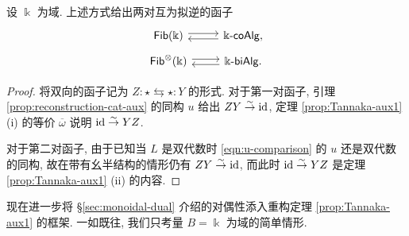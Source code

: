 \begin{theorem}\label{prop:Tannaka-reconstruction}
	设 $\Bbbk$ 为域. 上述方式给出两对互为拟逆的函子
	\[\begin{tikzcd}[row sep=tiny]
		\cate{Fib}(\Bbbk) \arrow[shift left, r] & \Bbbk\dcate{coAlg}, \arrow[shift left, l] \\
		\cate{Fib}^{\otimes}(\Bbbk) \arrow[shift left, r] & \Bbbk\dcate{biAlg}. \arrow[shift left, l]
	\end{tikzcd}\]
\end{theorem}
\begin{proof}
	将双向的函子记为 $Z: \star \leftrightarrows \star :Y$ 的形式. 对于第一对函子, 引理 \ref{prop:reconstruction-cat-aux} 的同构 $u$ 给出 $ZY \stackrel{\sim}{\rightarrow} \mathrm{id}$, 定理 \ref{prop:Tannaka-aux1} (i) 的等价 $\overline{\omega}$ 说明 $\mathrm{id} \stackrel{\sim}{\rightarrow} YZ$.
	
	对于第二对函子, 由于已知当 $L$ 是双代数时 \eqref{eqn:u-comparison} 的 $u$ 还是双代数的同构, 故在带有幺半结构的情形仍有 $ZY \stackrel{\sim}{\rightarrow} \mathrm{id}$, 而此时 $\mathrm{id} \stackrel{\sim}{\rightarrow} YZ$ 是定理 \ref{prop:Tannaka-aux1} (ii) 的内容.
\end{proof}

现在进一步将 \S\ref{sec:monoidal-dual} 介绍的对偶性添入重构定理 \ref{prop:Tannaka-aux1} 的框架. 一如既往, 我们只考量 $B = \Bbbk$ 为域的简单情形.

